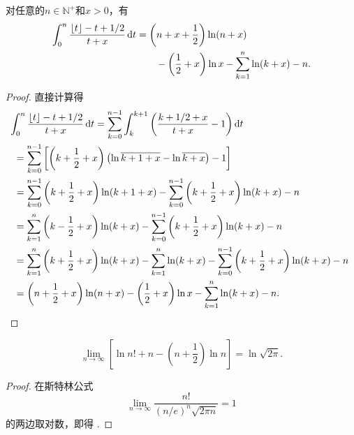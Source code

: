 \begin{lemma}\label{theorem:定积分.伽马函数的斯特灵近似.引理3}
对任意的\(n\in\mathbb{N}^+\)和\(x>0\)，有\begin{equation}\label{equation:定积分.伽马函数的斯特灵近似.引理3}
\begin{split}
\int_0^n \frac{\lfloor t\rfloor - t + 1/2}{t + x} \dd{t}
&= \left(n+x+\frac{1}{2}\right) \ln(n+x) \\
&\hspace{20pt}
- \left(\frac{1}{2}+x\right) \ln x
- \sum\limits_{k=1}^n \ln(k+x) - n.
\end{split}
\end{equation}
\begin{proof}
直接计算得\begin{align*}
&\hspace{-5pt}
\int_0^n \frac{\lfloor t\rfloor - t + 1/2}{t + x} \dd{t}
= \sum\limits_{k=0}^{n-1} \int_k^{k+1} \left(
\frac{k + 1/2 + x}{t + x} - 1
\right) \dd{t} \\
&= \sum\limits_{k=0}^{n-1} \left[
\left(k + \frac{1}{2} + x\right)
\left(\ln\overline{k+1+x} - \ln\overline{k+x}\right)
- 1
\right] \\
&= \sum\limits_{k=0}^{n-1} \left(k + \frac{1}{2} + x\right) \ln(k+1+x)
- \sum\limits_{k=0}^{n-1} \left(k + \frac{1}{2} + x\right) \ln(k+x)
- n \\
&= \sum\limits_{k=1}^n \left(k - \frac{1}{2} + x\right) \ln(k+x)
- \sum\limits_{k=0}^{n-1} \left(k + \frac{1}{2} + x\right) \ln(k+x)
- n \\
&= \sum\limits_{k=1}^n \left(k + \frac{1}{2} + x\right) \ln(k+x)
- \sum\limits_{k=1}^n \ln(k+x)
- \sum\limits_{k=0}^{n-1} \left(k + \frac{1}{2} + x\right) \ln(k+x)
- n \\
&= \left(n + \frac{1}{2} + x\right) \ln(n+x)
- \left(\frac{1}{2} + x\right) \ln x
- \sum\limits_{k=1}^n \ln(k+x)
- n.
\qedhere
\end{align*}
\end{proof}
\end{lemma}

\begin{lemma}\label{theorem:定积分.伽马函数的斯特灵近似.引理4}
\begin{equation}\label{equation:定积分.伽马函数的斯特灵近似.引理4}
\lim\limits_{n\to\infty} \left[
\ln n! + n - \left(n+\frac{1}{2}\right) \ln n
\right]
= \ln\sqrt{2\pi}.
\end{equation}
\begin{proof}
在斯特林公式\[
\lim\limits_{n\to\infty} \frac{n!}{(n/e)^n \sqrt{2\pi n}} = 1
\]的两边取对数，即得 .
\end{proof}
\end{lemma}


